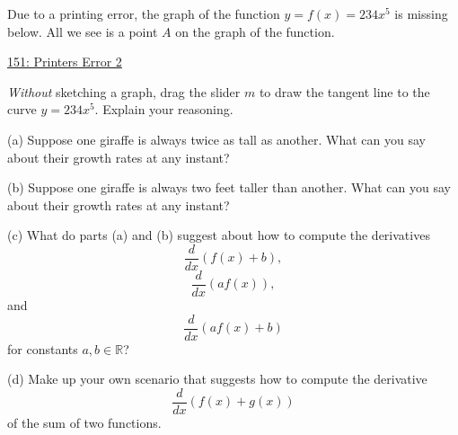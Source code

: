 \documentclass{ximera}
\begin{document}
\begin{question} \label{Qgkhkdsfete}
Due to a printing error, the graph of the function $y=f(x) = 234x^5$ is missing below. All we see is a point $A$ on the graph of the function. 

\begin{onlineOnly}
    \begin{center}
\end{center}
\end{onlineOnly}

\href{https://www.desmos.com/calculator/pjyqjtdcxm}{151: Printers Error 2}

\emph{Without} sketching a graph, drag the slider $m$ to draw the tangent line to the curve $y=234x^5$. Explain your reasoning.

\end{question}



\begin{question}   \label{Qergh55}
(a) Suppose one giraffe is always twice as tall as another. What can you say about their growth rates at any instant?

(b) Suppose one giraffe is always two feet taller than another. What can you say about their growth rates at any instant?

(c) What do parts (a) and (b) suggest about how to compute the derivatives
\[
   \frac{d}{dx} \left( f(x) + b  \right) ,
\]
\[
   \frac{d}{dx} \left(a f(x) \right) ,
\]
and
\[
    \frac{d}{dx} \left(a f(x) + b  \right)
\]
for constants $a,b\in \mathbb{R}$?

(d) Make up your own scenario that suggests how to compute the derivative
\[
   \frac{d}{dx} \left( f(x) + g(x)  \right) 
\]
of the sum of two functions.
\end{question}
\end{document}
